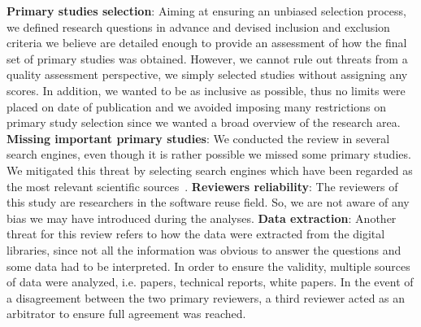 
\textbf{Primary studies selection}: Aiming at ensuring an unbiased selection process, we defined research questions in advance and devised inclusion and exclusion criteria we believe are detailed enough to provide an assessment of how the final set of primary studies was obtained. However, we cannot rule out threats from a quality assessment perspective, we simply selected studies without assigning any scores. In addition, we wanted to be as inclusive as possible, thus no limits were placed on date of publication and we avoided imposing many restrictions on primary study selection since we wanted a broad overview of the research area. \textbf{Missing important primary studies}: We conducted the review in several search engines, even though it is rather possible we missed some primary studies. We mitigated this threat by selecting search engines which have been regarded as the most relevant scientific sources~\cite{Kitchenham}. \textbf{Reviewers reliability}: The reviewers of this study are researchers in the software reuse field. So, we are not aware of any bias we may have introduced during the analyses. \textbf{Data extraction}: Another threat for this review refers to how the data were extracted from the digital libraries, since not all the information was obvious to answer the questions and some data had to be interpreted. In order to ensure the validity, multiple sources of data were analyzed, i.e. papers, technical reports, white papers. In the event of a disagreement between the two primary reviewers, a third reviewer acted as an arbitrator to ensure full agreement was reached.